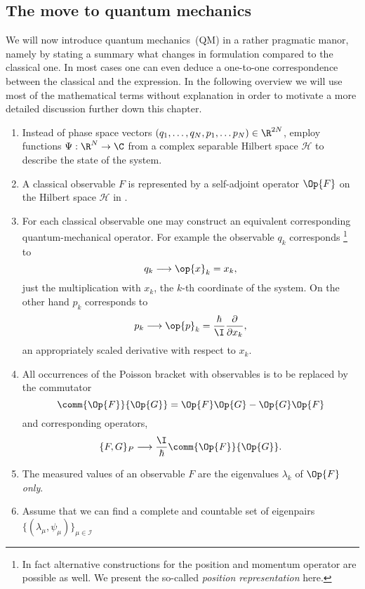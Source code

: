 \subsection{The move to quantum mechanics}
\defineabbr{QM}{QM\xspace}{quantum mechanics}
We will now introduce quantum mechanics~(QM) in a rather pragmatic manor,
namely by stating a summary what changes in \QM formulation
compared to the classical one.
In most cases one can even deduce a one-to-one correspondence
between the classical and the \QM expression.
In the following overview we will use most of the mathematical terms without explanation
in order to motivate a more detailed discussion further down this chapter.

\begin{enumerate}
	\item Instead of phase space vectors $\clphase \in \R^{2N}$,
		employ functions $\Psi : \R^N \to \C$ from a
		complex separable Hilbert space $\mathcal{H}$
		to describe the state of the system.
	\item A classical observable $F$ is represented by a
		self-adjoint operator $\Op{F}$ on the Hilbert space $\mathcal{H}$ in \QM.
	\item For each classical observable one may construct an equivalent
		corresponding quantum-mechanical operator.
		For example the observable $q_k$ corresponds%
		\footnote{In fact alternative constructions for the position and momentum
				operator are possible as well. We present the so-called
				\textit{position representation} here.}
		to
		\[ q_k \longrightarrow \op{x}_k = x_k, \]
		\ie just the multiplication with $x_k$,
		the $k$-th coordinate of the system.
		On the other hand $p_k$ corresponds to
		\[ p_k \longrightarrow \op{p}_k
			= \frac{\hbar}{\I} \frac{\partial}{\partial x_k}, \]
		an appropriately scaled derivative with respect to $x_k$.
	\item All occurrences of the Poisson bracket with observables
		is to be replaced by the commutator
		\begin{equation}
			\comm{\Op{F}}{\Op{G}} = \Op{F} \Op{G} - \Op{G} \Op{F}
			\label{eqn:Operator}
		\end{equation}
		and corresponding operators, \ie
		\[ \{F, G\}_P \longrightarrow \frac{\I}{\hbar} \comm{\Op{F}}{\Op{G}}. \]
	\item The measured values of an observable $F$
		are the eigenvalues $\lambda_k$ of $\Op{F}$ \emph{only}.
	\item Assume that we can find a complete and countable
		set of eigenpairs $\{ (\lambda_\mu, \psi_\mu) \}_{\mu \in \mathcal{I}}$

\end{enumerate}
